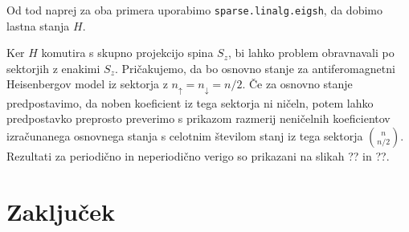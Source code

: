 \documentclass[paper=a4, fontsize=12pt]{scrartcl} %
\newcommand{\code}[1]{\texttt{#1}}
\begin{document}
Od tod naprej za oba primera uporabimo \code{sparse.linalg.eigsh}, da dobimo lastna stanja $H$.

Ker $H$ komutira s skupno projekcijo spina $S_z$, bi lahko problem obravnavali po sektorjih z enakimi $S_z$. Pričakujemo, da bo osnovno stanje za antiferomagnetni Heisenbergov model iz sektorja z $n_\uparrow=n_\downarrow=n/2$. Če za osnovno stanje predpostavimo, da noben koeficient iz tega sektorja ni ničeln, potem lahko predpostavko preprosto preverimo s prikazom razmerij neničelnih koeficientov izračunanega osnovnega stanja s celotnim številom stanj iz tega sektorja $\binom{n}{n/2}$. Rezultati za periodično in neperiodično verigo so prikazani na slikah ?? in ??.



\newpage
\section{Zaključek}
\end{document}
